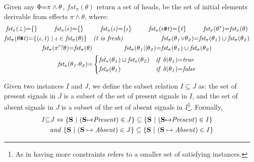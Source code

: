 \documentclass[acmsmall,10pt,review]{acmart}
\newcommand{\es}{\theta}
\newcommand{\ev}{\iota}
\newcommand{\effect}{\textcolor{black}{\ensuremath{\mathrm{\Phi}}}}
\newcommand{\seq}{\cdot}
\newcommand{\code}[1]{{\tt{\ensuremath{\m{#1}}}}}
\newcommand{\empt}{\textcolor{black}{\ensuremath{\epsilon}}}
\newcommand{\bott}{\textcolor{black}{\ensuremath{\bot}}}
\newcommand{\m}{\mathit}
\newcommand{\mysharp}{{\mathrel{\texttt{\#}}}}
\begin{document}
{\begin{definition}[First]\label{First}
  Given any \code{\effect {=} \pi \wedge \es},
  \code{fst_{{\pi}}(\es)} return a set of heads, be the set of initial elements   
  derivable from effects \code{\pi \wedge \es}, where: 
    { 
   \begin{gather*} 
  \code{fst_{{\pi}}( \bott) {=} \{\} } \qquad\ \ 
  \code{fst_{{\pi}}(\empt) {=}  \{\} } \qquad\ \ 
  \code{fst_{{\pi}}( \ev) {=} \{ \ev \}  }
  \qquad\ \ 
  \code{fst_{{\pi}}(  \epsilon \mysharp  t) {=}  \{ t \}}
  \qquad\ \ 
  \code{fst_{{\pi}}( {\es^\star} ) {=} fst_{{\pi}}({ \es})}
   \\
   \code{fst_{{\pi}}(\es \mysharp  t) {=}  \{(\ev, t) \ | \ \ev \in fst_{\pi}(\es) \}} 
   \ \ \  \emph{(t\ is\ fresh)}
  \qquad\quad 
  \qquad\quad
  \code{fst_{{\pi}}(  \es_1 {\vee} \es_2) {=} fst_{{\pi}}(  \es_1) \cup fst_{{\pi}}(  \es_2)  }  \\
  \code{fst_{{\pi}}( \pi^\prime? \es ) {=} fst_{\pi}(\es)  }
      \qquad\qquad\quad
     \code{fst_{{\pi}}(  \es_1 {||} \es_2) {=} fst_{{\pi}}(  \es_1) \cup fst_{{\pi}}(  \es_2)  }   
     \\
  {
  \code{fst_{{\pi}}(\es_1 {\seq} \es_2) {=} } 
  \begin{cases}
        \code{\code{fst_{{\pi}}(  \es_1)} \cup \code{fst_{{\pi}}(  \es_2)} } & \code{ if\ \delta(\es_1) {=} true}\\
        \code{\code{fst_{{\pi}}(  \es_1)}} & \code{  if\ \delta(\es_1) {=} false}
      \end{cases} 
      }  
  \end{gather*}
  }
\end{definition}




\begin{definition}\label{Subsumption}
Given two instances \code{I} and \code{J}, we define the subset relation \code{I {\subseteq} J} as: the set of present signals in \code{J} is a subset of the set of present signals in \code{I}, and the set of absent signals in \code{J} is a subset of the set of absent signals in \code{I}\footnote{As in having more constraints refers to a smaller set of satisfying instances.}.
Formally, 
 \begin{gather*} 
 \code{I {\subseteq} J \Leftrightarrow  \{\textbf{S}\ |\ (\textbf{S} {\mapsto} Present) \in J \}  \subseteq  \{\textbf{S}\ |\ (\textbf{S} {\mapsto} Present) \in I \}} \\
  \code{ \quad\  and  \ 
 \{\textbf{S}\ |\ (\textbf{S} \mapsto Absent) \in J \}  \subseteq  \{\textbf{S}\ |\ (\textbf{S} \mapsto Absent) \in I \}
 }
\end{gather*}


\end{definition}}
\end{document}
